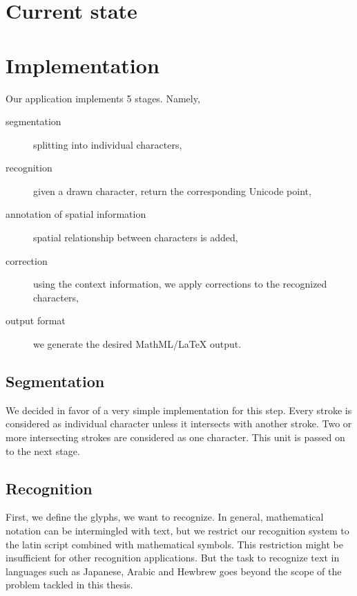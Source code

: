 
\section{Current state}
%

\section{Implementation}
\label{sec:implementation}
%
Our application implements 5 stages. Namely,
\begin{description}
\item[segmentation] splitting into individual characters,
\item[recognition] given a drawn character, return the corresponding Unicode point,
\item[annotation of spatial information] spatial relationship between characters is added,
\item[correction] using the context information, we apply corrections to the recognized characters,
\item[output format] we generate the desired MathML/\LaTeX{} output.
\end{description}

\subsection{Segmentation}
\label{sec:impl-segmentation}
%
We decided in favor of a very simple implementation for this step.
Every stroke is considered as individual character unless it intersects with another stroke.
Two or more intersecting strokes are considered as one character.
This unit is passed on to the next stage.

\subsection{Recognition}
\label{sec:impl-recognition}
%
First, we define the glyphs, we want to recognize. In general, mathematical notation can be intermingled with text,
but we restrict our recognition system to the latin script combined with mathematical symbols. This restriction might
be insufficient for other recognition applications. But the task to recognize text in languages such as Japanese, Arabic
and Hewbrew goes beyond the scope of the problem tackled in this thesis.


